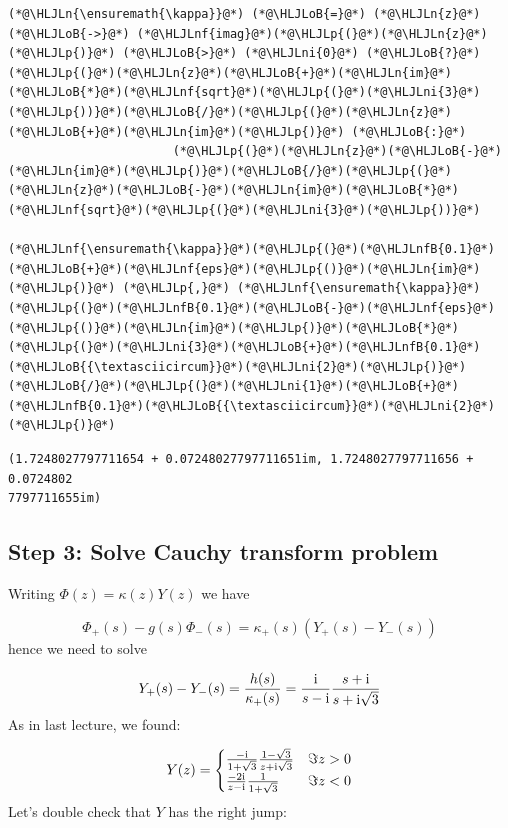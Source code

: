 \documentclass[12pt,a4paper]{article}
\newcommand{\HLJLn}[1]{#1}
\newcommand{\HLJLnf}[1]{\textcolor[RGB]{66,102,213}{#1}}
\newcommand{\HLJLnfB}[1]{\textcolor[RGB]{59,151,46}{#1}}
\newcommand{\HLJLni}[1]{\textcolor[RGB]{59,151,46}{#1}}
\newcommand{\HLJLoB}[1]{\textcolor[RGB]{102,102,102}{\textbf{#1}}}
\newcommand{\HLJLp}[1]{#1}
\def\I{ {\rm i} }
\begin{document}
\begin{lstlisting}
(*@\HLJLn{\ensuremath{\kappa}}@*) (*@\HLJLoB{=}@*) (*@\HLJLn{z}@*) (*@\HLJLoB{->}@*) (*@\HLJLnf{imag}@*)(*@\HLJLp{(}@*)(*@\HLJLn{z}@*)(*@\HLJLp{)}@*) (*@\HLJLoB{>}@*) (*@\HLJLni{0}@*) (*@\HLJLoB{?}@*) (*@\HLJLp{(}@*)(*@\HLJLn{z}@*)(*@\HLJLoB{+}@*)(*@\HLJLn{im}@*)(*@\HLJLoB{*}@*)(*@\HLJLnf{sqrt}@*)(*@\HLJLp{(}@*)(*@\HLJLni{3}@*)(*@\HLJLp{))}@*)(*@\HLJLoB{/}@*)(*@\HLJLp{(}@*)(*@\HLJLn{z}@*)(*@\HLJLoB{+}@*)(*@\HLJLn{im}@*)(*@\HLJLp{)}@*) (*@\HLJLoB{:}@*)
                       (*@\HLJLp{(}@*)(*@\HLJLn{z}@*)(*@\HLJLoB{-}@*)(*@\HLJLn{im}@*)(*@\HLJLp{)}@*)(*@\HLJLoB{/}@*)(*@\HLJLp{(}@*)(*@\HLJLn{z}@*)(*@\HLJLoB{-}@*)(*@\HLJLn{im}@*)(*@\HLJLoB{*}@*)(*@\HLJLnf{sqrt}@*)(*@\HLJLp{(}@*)(*@\HLJLni{3}@*)(*@\HLJLp{))}@*)

(*@\HLJLnf{\ensuremath{\kappa}}@*)(*@\HLJLp{(}@*)(*@\HLJLnfB{0.1}@*)(*@\HLJLoB{+}@*)(*@\HLJLnf{eps}@*)(*@\HLJLp{()}@*)(*@\HLJLn{im}@*)(*@\HLJLp{)}@*) (*@\HLJLp{,}@*) (*@\HLJLnf{\ensuremath{\kappa}}@*)(*@\HLJLp{(}@*)(*@\HLJLnfB{0.1}@*)(*@\HLJLoB{-}@*)(*@\HLJLnf{eps}@*)(*@\HLJLp{()}@*)(*@\HLJLn{im}@*)(*@\HLJLp{)}@*)(*@\HLJLoB{*}@*)(*@\HLJLp{(}@*)(*@\HLJLni{3}@*)(*@\HLJLoB{+}@*)(*@\HLJLnfB{0.1}@*)(*@\HLJLoB{{\textasciicircum}}@*)(*@\HLJLni{2}@*)(*@\HLJLp{)}@*)(*@\HLJLoB{/}@*)(*@\HLJLp{(}@*)(*@\HLJLni{1}@*)(*@\HLJLoB{+}@*)(*@\HLJLnfB{0.1}@*)(*@\HLJLoB{{\textasciicircum}}@*)(*@\HLJLni{2}@*)(*@\HLJLp{)}@*)
\end{lstlisting}

\begin{lstlisting}
(1.7248027797711654 + 0.07248027797711651im, 1.7248027797711656 + 0.0724802
7797711655im)
\end{lstlisting}


\subsection{Step 3: Solve Cauchy transform problem}
Writing $\Phi(z) = \kappa(z) Y(z)$ we have

\[
\Phi_+(s) - g(s) \Phi_-(s) = \kappa_+(s) (Y_+(s) - Y_-(s))
\]
hence we need to solve

\[
Y_+(s) - Y_-(s) = {h(s) \over \kappa_+(s)} = {\I \over s- \I} {s + \I \over s+ \I \sqrt{3}}
\]
As in last lecture, we found:

\[
Y(z) = \begin{cases} 
{-\I \over 1+\sqrt 3} {1-\sqrt 3 \over z+ \I \sqrt{3}} & \Im z > 0 \\
{-2 \I \over z-\I}{1 \over 1+ \sqrt{3}} & \Im z < 0
\end{cases}
\]
Let's double check that $Y$ has the right jump:
\end{document}
